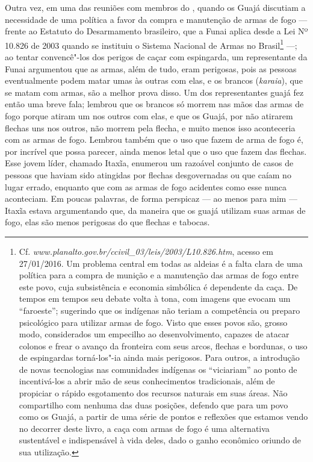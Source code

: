 Outra vez, em uma das reuniões com membros do , quando os Guajá
discutiam a necessidade de uma política a favor da compra e manutenção
de armas de fogo --- frente ao Estatuto do Desarmamento brasileiro, que a
Funai aplica desde a Lei Nº 10.826 de 2003 quando se instituiu o Sistema
Nacional de Armas no Brasil\footnote{Cf. \emph{www.planalto.gov.br/ccivil\_03/leis/2003/L10.826.htm},
  acesso em 27/01/2016. Um problema central em todas as aldeias é a
  falta clara de uma política para a compra de munição e a manutenção
  das armas de fogo entre este povo, cuja subsistência e economia
  simbólica é dependente da caça. De tempos em tempos seu debate volta à
  tona, com imagens que evocam um ``faroeste''; sugerindo que os
  indígenas não teriam a competência ou preparo psicológico para
  utilizar armas de fogo. Visto que esses povos são, grosso modo,
  considerados um empecilho ao desenvolvimento, capazes de atacar
  colonos e frear o avanço da fronteira com seus arcos, flechas e
  bordunas, o uso de espingardas torná-los"-ia ainda mais perigosos. Para
  outros, a introdução de novas tecnologias nas comunidades indígenas os
  ``viciariam'' ao ponto de incentivá-los a abrir mão de seus
  conhecimentos tradicionais, além de propiciar o rápido esgotamento dos
  recursos naturais em suas áreas. Não compartilho com nenhuma das duas
  posições, defendo que para um povo como os Guajá, a partir de uma
  série de pontos e reflexões que estamos vendo no decorrer deste livro,
  a caça com armas de fogo é uma alternativa sustentável e indispensável
  à vida deles, dado o ganho econômico oriundo de sua utilização.} ---; ao
tentar convencê"-los dos perigos de caçar com espingarda, um
representante da Funai argumentou que as armas, além de tudo, eram
perigosas, pois as pessoas eventualmente podem matar umas às outras com
elas, e os brancos (\emph{karaia}), que se matam com armas, são a melhor
prova disso. Um dos representantes guajá fez então uma breve fala;
lembrou que os brancos só morrem nas mãos das armas de fogo porque
atiram um nos outros com elas, e que os Guajá, por não atirarem flechas
uns nos outros, não morrem pela flecha, e muito menos isso aconteceria
com as armas de fogo. Lembrou também que o uso que fazem de arma de fogo
é, por incrível que possa parecer, ainda menos letal que o uso que fazem
das flechas. Esse jovem líder, chamado Itaxĩa, enumerou um razoável
conjunto de casos de pessoas que haviam sido atingidas por flechas
desgovernadas ou que caíam no lugar errado, enquanto que com as armas de
fogo acidentes como esse nunca aconteciam. Em poucas palavras, de forma
perspicaz --- ao menos para mim --- Itaxĩa estava argumentando que, da
maneira que os guajá utilizam suas armas de fogo, elas são menos
perigosas do que flechas e tabocas.

